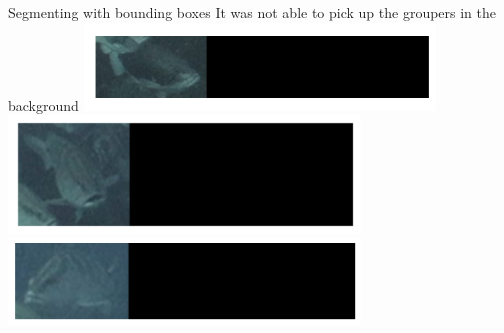 \begin{frame}{Segmenting with bounding boxes}
    It was not able to pick up the groupers in the background 
    \centering
   \includegraphics[height=0.7\textheight,width=0.7\textwidth,keepaspectratio]{images/gm3-6.png}
   \centering
   \includegraphics[height=0.7\textheight,width=0.7\textwidth,keepaspectratio]{images/gm3-7.png}
   \centering
   \includegraphics[height=0.7\textheight,width=0.7\textwidth,keepaspectratio]{images/gm3-8.png}
   
\end{frame}






